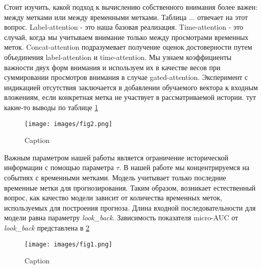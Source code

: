 \documentclass[a4paper, 12pt]{article} %
\begin{document}
Стоит изучить, какой подход к вычислению собственного внимания более важен: между метками или между временными метками.
Таблица ... отвечает на этот вопрос.
Label-attention - это наша базовая реализация. Time-attention - это случай, когда мы учитываем внимание только между просмотрами временных меток. Concat-attention подразумевает получение оценок достоверности путем объединения label-attention и time-attention. Мы узнаем коэффициенты важности двух форм внимания и используем их в качестве весов при суммировании просмотров внимания в случае gated-attention. Эксперимент с индикацией отсутствия заключается в добавлении обучаемого вектора к входным вложениям, если конкретная метка не участвует в рассматриваемой истории.
тут какие-то выводы по таблице \ref{fig:fig2}
\begin{figure}
    \centering
    \texttt{[image: images/fig2.png]}
    \caption{Caption}
    \label{fig:fig2}
\end{figure}

Важным параметром нашей работы является ограничение исторической информации с помощью параметра $\tau$. В нашей работе мы концентрируемся на событиях с временными метками. Модель учитывает только последние временные метки для прогнозирования. Таким образом, возникает естественный вопрос, как качество модели зависит от количества временных меток, используемых для построения прогноза. Длина входной последовательности для модели равна параметру \textit{look\_back}. Зависимость показателя micro-AUC от \textit{look\_back} представлена в \ref{fig:fig1}

\begin{figure}
    \centering
    \texttt{[image: images/fig1.png]}
    \caption{Caption}
    \label{fig:fig1}
\end{figure}
 


\end{document}
